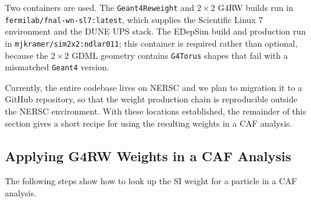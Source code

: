 \documentclass[%
article,
nofootinbib
]{revtex4-2}
\DeclareRobustCommand{\gfour}{\texttt{Geant4}}
\begin{document}
Two containers are used. The \texttt{Geant4Reweight} and $2\times2$ G4RW builds
run in \texttt{fermilab/fnal-wn-sl7:latest}, which supplies the Scientific Linux
7 environment and the DUNE UPS stack. The EDepSim build and production run in
\texttt{mjkramer/sim2x2:ndlar011}; this container is required rather than
optional, because the $2\times2$ GDML geometry contains \texttt{G4Torus} shapes
that fail with a mismatched \gfour{} version.

Currently, the entire codebase lives on NERSC and we plan to migration it to a GitHub repository, so that the
weight production chain is reproducible outside the NERSC environment. With these locations established, the
remainder of this section gives a short recipe for using the resulting
weights in a CAF analysis.


\subsection{\label{subsec:usage}Applying G4RW Weights in a CAF Analysis}

The following steps show how to look up the SI weight for a particle in a CAF analysis.
\end{document}
